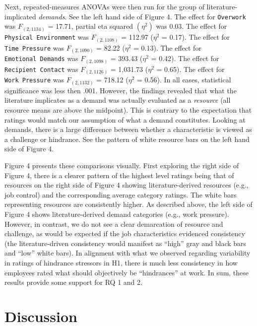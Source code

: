 \documentclass[
  english,
  man]{apa6}
\begin{document}
Next, repeated-measures ANOVAs were then run for the group of literature-implicated \emph{demands}. See the left hand side of Figure 4. The effect for \texttt{Overwork} was \(F_{(2, 1134)}\) = 17.71, partial eta squared \((\eta^2)\) was 0.03. The effect for \texttt{Physical\ Environment} was \(F_{(2, 1108)}\) = 112.97 (\(\eta^2\) = 0.17). The effect for \texttt{Time\ Pressure} was \(F_{(2, 1090)}\) = 82.22 (\(\eta^2\) = 0.13). The effect for \texttt{Emotional\ Demands} was \(F_{(2, 1098)}\) = 393.43 (\(\eta^2\) = 0.42).
The effect for \texttt{Recipient\ Contact} was \(F_{(2, 1126)}\) = 1,031.73 (\(\eta^2\) = 0.65). The effect for \texttt{Work\ Pressure} was \(F_{(2, 1132)}\) = 718.12 (\(\eta^2\) = 0.56). In all cases, statistical significance was less then .001. However, the findings revealed that what the literature implicates as a demand was actually evaluated as a \emph{resource} (all resource means are above the midpoint). This is contrary to the expectation that ratings would match our assumption of what a demand constitutes. Looking at demands, there is a large difference between whether a characteristic is viewed as a challenge or hindrance. See the pattern of white resource bars on the left hand side of Figure 4.

Figure 4 presents these comparisons visually. First exploring the right side of Figure 4, there is a clearer pattern of the highest level ratings being that of resources on the right side of Figure 4 showing literature-derived resources (e.g., job control) and the corresponding average category ratings. The white bars representing resources are consistently higher. As described above, the left side of Figure 4 shows literature-derived demand categories (e.g., work pressure). However, in contrast, we do not see a clear demarcation of resource and challenge, as would be expected if the job characteristics evidenced consistency (the literature-driven consistency would manifest as ``high'' gray and black bars and ``low'' white bars). In alignment with what we observed regarding variability in ratings of hindrance stressors in H1, there is much less consistency in how employees rated what should objectively be ``hindrances'' at work. In sum, these results provide some support for RQ 1 and 2.

\hypertarget{discussion}{%
\section{Discussion}\label{discussion}}
\end{document}
